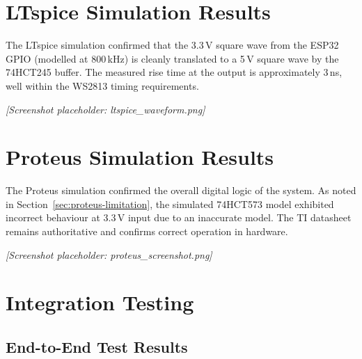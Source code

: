 \section{LTspice Simulation Results}
\label{sec:ltspice-results}

The LTspice simulation confirmed that the 3.3\,V square wave from the ESP32 GPIO (modelled at 800\,kHz) is cleanly translated to a 5\,V square wave by the 74HCT245 buffer. The measured rise time at the output is approximately 3\,ns, well within the WS2813 timing requirements.

\textit{[Screenshot placeholder: ltspice\_waveform.png]}

\section{Proteus Simulation Results}
\label{sec:proteus-results}

The Proteus simulation confirmed the overall digital logic of the system. As noted in Section~\ref{sec:proteus-limitation}, the simulated 74HCT573 model exhibited incorrect behaviour at 3.3\,V input due to an inaccurate model. The TI datasheet\cite{sn74hct573_ds} remains authoritative and confirms correct operation in hardware.

\textit{[Screenshot placeholder: proteus\_screenshot.png]}

\section{Integration Testing}
\label{sec:integration-testing}

\subsection{End-to-End Test Results}
\label{sec:e2e-tests}

